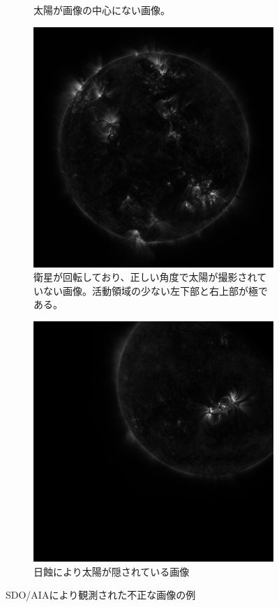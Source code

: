 \begin{figure}[htbp]
\begin{subfigure}[b]{0.48\textwidth}
        \caption{太陽が画像の中心にない画像。}
    \end {subfigure}
    \begin{subfigure}[b]{0.48\textwidth}
        \includegraphics[width=\textwidth]{figures/bad_sample2.jpg}
        \caption{衛星が回転しており、正しい角度で太陽が撮影されていない画像。活動領域の少ない左下部と右上部が極である。}
    \end {subfigure}
    \hfill
    \begin{subfigure}[b]{0.48\textwidth}
        \includegraphics[width=\textwidth]{figures/bad_sample1.jpg}
        \caption{日蝕により太陽が隠されている画像}
    \end {subfigure}
    \caption{SDO/AIAにより観測された不正な画像の例}
    \label{fig:bad_aia_samples}
\end{figure}


